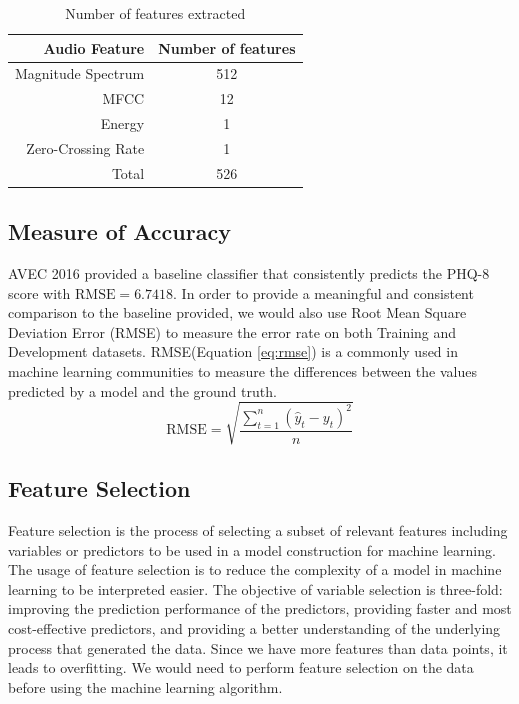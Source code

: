 \documentclass{article}
\begin{document}
 	\begin{table}[h]
 		\begin{center}
  			\begin{tabular}{ | r | c | }
    			\hline
			 Audio Feature & Number of features \\ \hline\hline
			 Magnitude Spectrum               & 512 \\ \hline
			 MFCC           & 12 \\ \hline
			 Energy        & 1 \\ \hline
			 Zero-Crossing Rate & 1 \\ \hline \hline
			 Total & 526 \\ \hline
			 \end{tabular}
		\end{center}
 	\caption{Number of features extracted}
 	\label{no_features}
 	\end{table}

 	\subsection{Measure of Accuracy}
	AVEC 2016 provided a baseline classifier that consistently predicts the PHQ-8 score with $\text{RMSE}=6.7418$\cite{avec2016}. 
	In order to provide a meaningful and consistent comparison to the baseline provided, we would also use Root Mean Square Deviation Error (RMSE) to measure the error rate on both 
	Training and Development datasets. RMSE(Equation \ref{eq:rmse}) is a commonly used in machine learning communities to measure the differences between the values predicted by a model 
	and the ground truth\cite{Dhanani:EECS-2014-131}. 
	\begin{equation}\label{eq:rmse}
  	\text{RMSE} = \sqrt{\frac{\sum_{t=1}^n (\hat y_t - y_t)^2}{n}}
 	\end{equation} 

	\subsection{Feature Selection}
	Feature selection is the process of selecting a subset of relevant features including variables or predictors to be used in a model construction for machine learning. 
	The usage of feature selection is to reduce the complexity of a model in machine learning to be interpreted easier. 
	The objective of variable selection is three-fold: improving the prediction performance of the predictors, providing faster and most cost-effective predictors, 
	and providing a better understanding of the underlying process that generated the data. \cite{Guyon2003} Since we have more features than data points, it leads to overfitting\cite{Smith2011}. We would
	 need to perform feature selection on the data before using the machine learning algorithm.
	 
\end{document}
